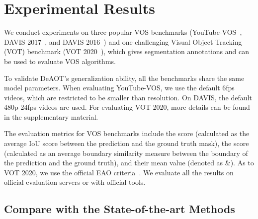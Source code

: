 \documentclass{article}
\begin{document}
\section{Experimental Results}\label{sec:experiments}
We conduct experiments on three popular VOS benchmarks (YouTube-VOS~\cite{youtubevos}, DAVIS 2017~\cite{davis2017}, and DAVIS 2016~\cite{davis2016}) and one challenging Visual Object Tracking (VOT) benchmark (VOT 2020~\cite{vot2020}), which gives segmentation annotations and can be used to evaluate VOS algorithms. 

To validate DeAOT's generalization ability, all the benchmarks share the same model parameters. When evaluating YouTube-VOS, we use the default 6fps videos, which are restricted to be smaller than  resolution. On DAVIS, the default 480p 24fps videos are used. For evaluating VOT 2020, more details can be found in the supplementary material.

The evaluation metrics for VOS benchmarks include the  score (calculated as the average IoU score between the prediction and the ground truth mask), the  score (calculated as an average boundary similarity measure between the boundary of the prediction and the ground truth), and their mean value (denoted as \&). As to VOT 2020, we use the official EAO criteria~\cite{vot2020}. We evaluate all the results on official evaluation servers or with official tools.

\subsection{Compare with the State-of-the-art Methods}
\end{document}
